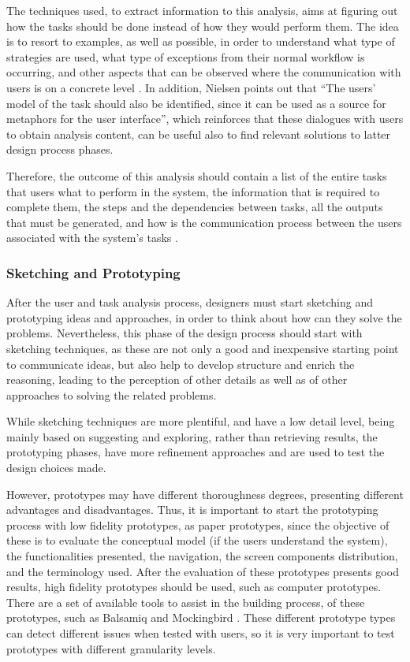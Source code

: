 The techniques used, to extract information to this analysis, aims at figuring out how the tasks should be done instead of how they would perform them. The idea is to resort to examples, as well as possible, in order to understand what type of strategies are used, what type of exceptions from their normal workflow is occurring, and other aspects that can be observed where the communication with users is on a concrete level \cite{usabilityEngineering}. In addition, Nielsen \cite{usabilityEngineering} points out that  “The users' model of the task should also be identified, since it can be used as a source for metaphors for the user interface”, which reinforces that these dialogues with users to obtain analysis content, can be useful also to find relevant solutions to latter design process phases.

Therefore, the outcome of this analysis should contain a list of the entire tasks that users what to perform in the system, the information that is required to complete them, the steps and the dependencies between tasks, all the outputs that must be generated, and how is the communication process between the users associated with the system’s tasks \cite{usabilityEngineering}.


\subsubsection{Sketching and Prototyping}
\label{subsubsec:sketching_and_prototyping}
After the user and task analysis process, designers must start sketching and prototyping ideas and approaches, in order to think about how can they solve the problems. Nevertheless, this phase of the design process should start with sketching techniques, as these are not only a good and inexpensive starting point to communicate ideas, but also help to develop structure and enrich the reasoning, leading to the perception of other details as well as of other approaches to solving the related problems.

While sketching techniques are more plentiful, and have a low detail level, being mainly based on suggesting and exploring, rather than retrieving results, the prototyping phases, have more refinement approaches and are used to test the design choices made.

However, prototypes may have different thoroughness degrees, presenting different advantages and disadvantages. Thus, it is important to start the prototyping process with low fidelity prototypes, as paper prototypes, since the objective of these is to evaluate the conceptual model (if the users understand the system), the functionalities presented, the navigation, the screen components distribution, and the terminology used. After the evaluation of these prototypes presents good results, high fidelity prototypes should be used, such as computer prototypes. There are a set of available tools to assist in the building process, of these prototypes, such as Balsamiq \cite{balsamiq} and Mockingbird \cite{mockingbird}. These different prototype types can detect different issues when tested with users, so it is very important to test prototypes with different granularity levels.

